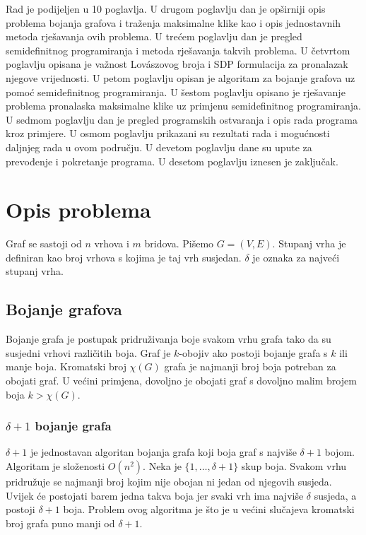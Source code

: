 \documentclass[diplomskirad]{fer}
\begin{document}
Rad je podijeljen u 10 poglavlja. U drugom poglavlju dan je opširniji opis problema bojanja grafova
i traženja maksimalne klike kao i opis jednostavnih metoda rješavanja ovih problema.
U trećem poglavlju dan je pregled semidefinitnog programiranja i metoda rješavanja takvih problema.
U četvrtom poglavlju opisana je važnost Lovászovog broja i SDP formulacija za pronalazak njegove vrijednosti.
U petom poglavlju opisan je algoritam za bojanje grafova uz pomoć semidefinitnog programiranja.
U šestom poglavlju opisano je rješavanje problema pronalaska maksimalne klike uz primjenu semidefinitnog programiranja.
U sedmom poglavlju dan je pregled programskih ostvaranja i opis rada programa kroz primjere.
U osmom poglavlju prikazani su rezultati rada i mogućnosti daljnjeg rada u ovom području.
U devetom poglavlju dane su upute za prevođenje i pokretanje programa.
U desetom poglavlju iznesen je zaključak.

\chapter{Opis problema}
\label{opis_problema}

Graf se sastoji od $n$ vrhova i $m$ bridova. Pišemo $G = (V, E)$. Stupanj vrha je definiran kao broj vrhova s kojima je taj vrh susjedan. $\delta$ je
oznaka za najveći stupanj vrha.

\section{Bojanje grafova}
Bojanje grafa je postupak pridruživanja boje svakom vrhu grafa tako da su susjedni vrhovi različitih boja. Graf je $k$-obojiv ako postoji
bojanje grafa s $k$ ili manje boja. Kromatski broj $\chi(G)$ grafa je najmanji broj boja potreban za obojati graf. U većini primjena,
dovoljno je obojati graf s dovoljno malim brojem boja $k > \chi(G)$.

\subsection{$\delta + 1$ bojanje grafa}
\label{delta1}
$\delta + 1$ je jednostavan algoritan bojanja grafa koji boja graf s najviše $\delta + 1$ bojom. Algoritam je složenosti $O(n^2)$.
Neka je $\{1, \dots, \delta + 1\}$ skup boja. Svakom vrhu pridružuje se najmanji broj kojim nije obojan ni jedan od njegovih susjeda. Uvijek će postojati
barem jedna takva boja jer svaki vrh ima najviše $\delta$ susjeda, a postoji $\delta + 1$ boja. Problem ovog algoritma je što je u većini slučajeva 
kromatski broj grafa puno manji od $\delta + 1$.
\end{document}
